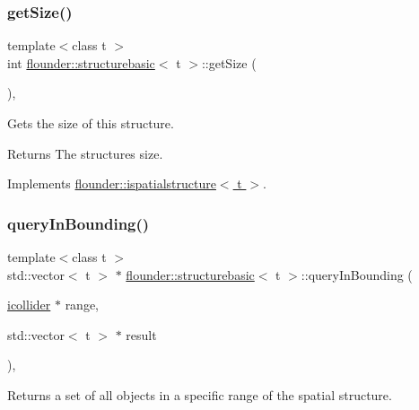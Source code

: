 \subsubsection{\texorpdfstring{get\+Size()}{getSize()}}
{\footnotesize\ttfamily template$<$class t $>$ \\
int \hyperlink{classflounder_1_1structurebasic}{flounder\+::structurebasic}$<$ t $>$\+::get\+Size (\begin{DoxyParamCaption}{ }\end{DoxyParamCaption})\hspace{0.3cm}{\ttfamily [override]}, {\ttfamily [virtual]}}



Gets the size of this structure. 

\begin{DoxyReturn}{Returns}
The structures size. 
\end{DoxyReturn}


Implements \hyperlink{classflounder_1_1ispatialstructure_a9daf7778a9bde304e08070eaeffb8fbd}{flounder\+::ispatialstructure$<$ t $>$}.

\mbox{\label{classflounder_1_1structurebasic_a977c80f9e4982f40afc5400714620a31}} 
\subsubsection{\texorpdfstring{query\+In\+Bounding()}{queryInBounding()}}
{\footnotesize\ttfamily template$<$class t $>$ \\
std\+::vector$<$ t $>$ $\ast$ \hyperlink{classflounder_1_1structurebasic}{flounder\+::structurebasic}$<$ t $>$\+::query\+In\+Bounding (\begin{DoxyParamCaption}\item[{\hyperlink{classflounder_1_1icollider}{icollider} $\ast$}]{range,  }\item[{std\+::vector$<$ t $>$ $\ast$}]{result }\end{DoxyParamCaption})\hspace{0.3cm}{\ttfamily [override]}, {\ttfamily [virtual]}}



Returns a set of all objects in a specific range of the spatial structure. 


